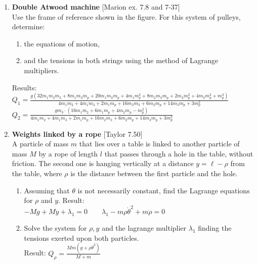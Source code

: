 \documentclass[11pt, a4paper, twoside]{article}
\begin{document}
\begin{enumerate}
	
	\item
	\begin{minipage}[t][6.5cm]{0.65\textwidth}
	\textbf{Double Atwood machine} [Marion ex. 7.8 and 7-37]\\
	Use the frame of reference shown in the figure.
	For this system of pulleys, determine: 
	\begin{enumerate}
		\item the equations of motion,
		\item and the tensions in both strings using the method of Lagrange multipliers.
	\end{enumerate}
	Results:\\
	\(
		Q_{1} = \frac{g \left(32 m_{1} m_{2} m_{3} + 8 m_{1} m_{2} m_{p} + 20 m_{1} m_{3} m_{p} + 4 m_{1} m_{p}^{2} + 8 m_{2} m_{3} m_{p} + 2 m_{2} m_{p}^{2} + 4 m_{3} m_{p}^{2} + m_{p}^{3}\right)}{4 m_{1} m_{2} + 4 m_{1} m_{3} + 2 m_{1} m_{p} + 16 m_{2} m_{3} + 6 m_{2} m_{p} + 14 m_{3} m_{p} + 3 m_{p}^{2}}
	\)\\
	\(
		Q_{2} = \frac{g m_{3} \cdot \left(16 m_{1} m_{2} + 6 m_{1} m_{p} + 4 m_{2} m_{p} - m_{p}^{2}\right)}{4 m_{1} m_{2} + 4 m_{1} m_{3} + 2 m_{1} m_{p} + 16 m_{2} m_{3} + 6 m_{2} m_{p} + 14 m_{3} m_{p} + 3 m_{p}^{2}}
	\)
	\end{minipage}
	\begin{minipage}[c][0.5cm][t]{0.3\textwidth}
		
	\end{minipage}


	\item
	\begin{minipage}[t][6cm]{0.65\textwidth}
		\textbf{Weights linked by a rope} [Taylor 7.50]\\
		A particle of mass \(m\) that lies over a table is linked to another particle of mass \(M\) by a rope of length \(l\) that passes through a hole in the table, without friction.
		The second one is hanging vertically at a distance \(y = \ell - \rho\) from the table, where \(\rho\) is the distance between the first particle and the hole.
		\begin{enumerate}
			\item Assuming that \(\theta\) is not necessarily constant, find the Lagrange equations for \(\rho\) and \(y\). Result:\\ \(- M g + M \ddot{y} + \lambda_{1} = 0 \qquad \lambda_{1} - m \rho \dot{\theta}^{2} + m \ddot{\rho} = 0\)
			\item Solve the system for \(\rho, y\) and the lagrange multiplier \(\lambda_1\) finding the tensions exerted upon both particles.\\
			Result: \(Q_{\rho} = \frac{M m \left(g + \rho \dot{\theta}^{2}\right)}{M + m}\)
		\end{enumerate}
	\end{minipage}
	\begin{minipage}[c][0cm][t]{0.3\textwidth}
		
	\end{minipage}



\end{enumerate}
\end{document}
